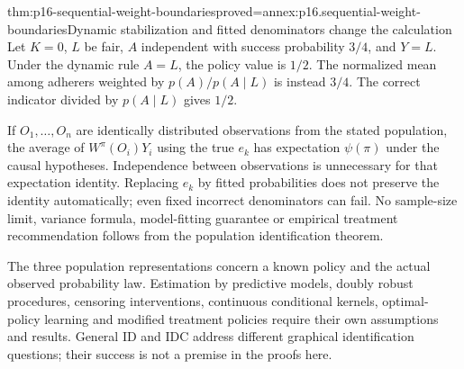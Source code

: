 \begin{hbtheorem}{thm:p16-sequential-weight-boundaries}{proved=annex:p16.sequential-weight-boundaries}{Dynamic stabilization and fitted denominators change the calculation}
Let \(K=0\), \(L\) be fair, \(A\) independent with success probability
\(3/4\), and \(Y=L\). Under the dynamic rule \(A=L\), the policy value
is \(1/2\). The normalized mean among adherers weighted by
\(p(A)/p(A\mid L)\) is instead \(3/4\). The correct indicator divided
by \(p(A\mid L)\) gives \(1/2\).

If \(O_1,\ldots,O_n\) are identically distributed observations from the
stated population, the average of \(W^\pi(O_i)Y_i\) using the true
\(e_k\) has expectation \(\psi(\pi)\) under the causal hypotheses.
Independence between observations is unnecessary for that expectation
identity. Replacing \(e_k\) by fitted probabilities does not preserve
the identity automatically; even fixed incorrect denominators can fail.
No sample-size limit, variance formula, model-fitting guarantee or empirical
treatment recommendation follows from the population identification theorem.
\end{hbtheorem}

The three population representations concern a known policy and the actual
observed probability law. Estimation by predictive models, doubly robust
procedures, censoring interventions, continuous conditional kernels,
optimal-policy learning and modified treatment policies require their own
assumptions and results. General ID and IDC address different graphical
identification questions; their success is not a premise in the proofs here.
